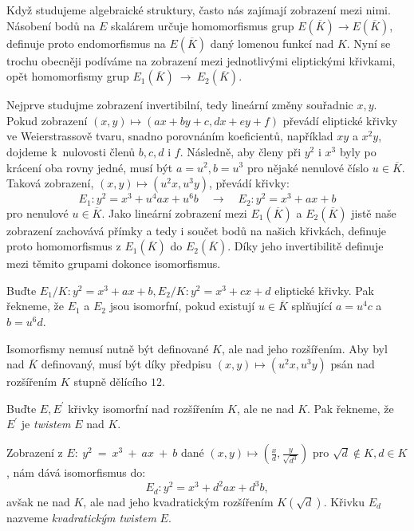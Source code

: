 \documentclass[12pt]{report}
\begin{document}
Když studujeme algebraické struktury, často nás zajímají zobrazení mezi nimi. Násobení bodů na $E$ skalárem určuje homomorfismus grup $E(\overline{K}) \longrightarrow E(\overline{K})$, definuje proto endomorfismus na $E(\overline{K})$ daný lomenou funkcí nad $K$. Nyní se trochu obecněji podíváme na zobrazení mezi jednotlivými eliptickými křivkami, opět homomorfismy grup $E_1(\overline{K})~\longrightarrow~E_2(\overline{K})$.

Nejprve studujme zobrazení invertibilní, tedy lineární změny souřadnic $x,y$. Pokud zobrazení $(x,y) \mapsto (ax+by+c,dx+ey+f)$ převádí eliptické křivky ve Weierstrassově tvaru, snadno porovnáním koeficientů, například $xy$ a $x^2 y$, dojdeme k~nulovosti členů $b,c,d$ i $f$. Následně, aby členy při $y^2$ i $x^3$ byly po krácení oba rovny jedné, musí být $a = u^2, b = u^3$ pro nějaké nenulové číslo $u \in \overline{K}$. Taková zobrazení, $(x,y) \mapsto (u^2 x, u^3 y)$, převádí křivky:
\begin{equation*}
E_1 : y^2 = x^3 + u^4 a x + u^6 b \quad \longrightarrow \quad E_2 :  y^2 = x^3 + ax + b 
\end{equation*}
pro nenulové $u \in \overline{K}$. Jako lineární zobrazení mezi $E_1(\overline{K})$ a $E_2(\overline{K})$ jistě naše zobrazení zachovává přímky a tedy i součet bodů na našich křivkách, definuje proto homomorfismus z $E_1(\overline{K})$ do $E_2(\overline{K})$. Díky jeho invertibilitě definuje mezi těmito grupami dokonce isomorfismus.

\begin{definice}
Buďte $E_1/K : y^2 = x^3 + ax + b, E_2/K : y^2 = x^3 + cx + d$ eliptické křivky. Pak řekneme, že $E_1$ a $E_2$ jsou isomorfní, pokud existují $u \in \overline{K}$ splňující $a = u^4 c$ a $b = u^6 d$.
\end{definice}

Isomorfismy nemusí nutně být definované $K$, ale nad jeho rozšířením. Aby byl nad $\overline{K}$ definovaný, musí být díky předpisu $(x,y) \mapsto (u^2 x, u^3 y)$ psán nad rozšířením $K$ stupně dělícího $12$.
\begin{definice}
Buďte $E,E^\prime$ křivky isomorfní nad rozšířením $K$, ale ne nad $K$. Pak řekneme, že $E^\prime$ je \textit{twistem} $E$ nad $K$.
\end{definice}
Zobrazení z  $E:~y^2~=~x^3~+~ax~+~b$ dané $(x,y) \mapsto \left(\frac{x}{d}, \frac{y}{\sqrt{d^3}}\right) $ pro $\sqrt{d} \not \in K, d \in K$, nám dává isomorfismus do:
\begin{equation*}
E_d : y^2 = x^3 + d^2 a x + d^3 b,
\end{equation*}
avšak ne nad $K$, ale nad jeho kvadratickým rozšířením $K(\sqrt{d})$. Křivku $E_d$ nazveme \textit{kvadratickým twistem} $E$.
\end{document}
